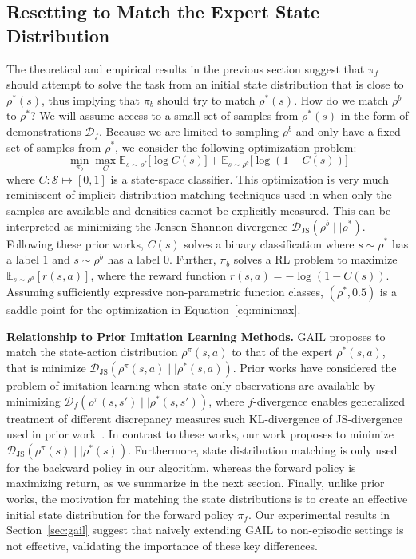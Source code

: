 \documentclass[nohyperref]{article}
\theoremstyle{plain}
\theoremstyle{definition}
\theoremstyle{remark}
\begin{document}
\subsection{Resetting to Match the Expert State Distribution}
\label{sec:disc}
The theoretical and empirical results in the previous section suggest that $\pi_f$ should attempt to solve the task from an initial state distribution that is close to $\rho^*(s)$, thus implying that $\pi_b$ should try to match $\rho^*(s)$. 
How do we match $\rho^b$ to $\rho^*$? We will assume access to a small set of samples from $\rho^*(s)$ in the form of demonstrations $\mathcal{D}_f$. Because we are limited to sampling $\rho^b$ and only have a fixed set of samples from $\rho^*$, we consider the following optimization problem:
\begin{equation}
    \label{eq:minimax}
    \min_{\pi_b} \max_C \mathbb{E}_{s \sim \rho^*}\big[\log C(s)\big] + \mathbb{E}_{s \sim \rho^b}\big[\log (1-C(s))\big]
\end{equation}
where $C: \mathcal{S} \mapsto [0, 1]$ is a state-space classifier. This optimization is very much reminiscent of implicit distribution matching techniques used in \citep{goodfellow2014generative, nowozin2016f, ho2016generative, ghasemipour2020divergence} when only the samples are available and densities cannot be explicitly measured.
This can be interpreted as minimizing the Jensen-Shannon divergence $\mathcal{D}_{\textrm{JS}}(\rho^b \mid\mid \rho^*)$.
Following these prior works, $C(s)$ solves a binary classification where $s \sim \rho^*$ has a label $1$ and $s \sim \rho^b$ has a label $0$. Further, $\pi_b$ solves a RL problem to maximize ${\mathbb{E}_{s \sim \rho^b} [r(s, a)]}$, where the reward function $r(s, a) = -\log(1 - C(s))$. Assuming sufficiently expressive non-parametric function classes, $(\rho^*, 0.5)$ is a saddle point for the optimization in Equation~\ref{eq:minimax}.


\textbf{Relationship to Prior Imitation Learning Methods.} GAIL \citep{ho2016generative} proposes to match the state-action distribution $\rho^\pi(s, a)$ to that of the expert $\rho^*(s, a)$, that is minimize $\mathcal{D}_{\textrm{JS}}(\rho^\pi(s, a) \mid\mid \rho^*(s, a))$. Prior works have considered the problem of imitation learning when state-only observations are available \citep{torabi2019adversarial, zhu2020off} by minimizing $\mathcal{D}_{f}(\rho^\pi(s, s') \mid\mid \rho^*(s, s'))$, where $f$-divergence enables generalized treatment of different discrepancy measures such KL-divergence of JS-divergence used in prior work~\citep{nowozin2016f}.
In contrast to these works, our work proposes to minimize $\mathcal{D}_{\textrm{JS}}(\rho^\pi (s) \mid\mid \rho^*(s))$. Furthermore, state distribution matching is only used for the backward policy in our algorithm, whereas the forward policy is maximizing return, as we summarize in the next section. Finally, unlike prior works, the motivation for matching the state distributions is to create an effective initial state distribution for the forward policy $\pi_f$. Our experimental results in Section~\ref{sec:gail} suggest that naively extending GAIL to non-episodic settings is not effective, validating the importance of these key differences.
\end{document}
